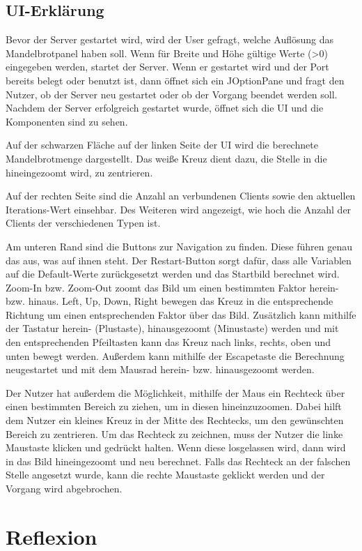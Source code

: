 \documentclass[12pt, onecolumn, notitlepage]{scrartcl}
\begin{document}
\subsection{UI-Erklärung}
Bevor der Server gestartet wird, wird der User gefragt, welche Auflösung das Mandelbrotpanel haben soll. Wenn für Breite und Höhe gültige Werte (>0) eingegeben werden, startet der Server. Wenn er gestartet wird und der Port bereits belegt oder benutzt ist, dann öffnet sich ein JOptionPane und fragt den Nutzer, ob der Server neu gestartet oder ob der Vorgang beendet werden soll. Nachdem der Server erfolgreich gestartet wurde, öffnet sich die UI und die Komponenten sind zu sehen. \par
Auf der schwarzen Fläche auf der linken Seite der UI wird die berechnete Mandelbrotmenge dargestellt. Das weiße Kreuz dient dazu, die Stelle in die hineingezoomt wird, zu zentrieren. \par
Auf der rechten Seite sind die Anzahl an verbundenen Clients sowie den aktuellen Iterations-Wert einsehbar. Des Weiteren wird angezeigt, wie hoch die Anzahl der Clients der verschiedenen Typen ist. \par
Am unteren Rand sind die Buttons zur Navigation zu finden. Diese führen genau das aus, was auf ihnen steht. Der Restart-Button sorgt dafür, dass alle Variablen auf die Default-Werte zurückgesetzt werden und das Startbild berechnet wird. Zoom-In bzw. Zoom-Out zoomt das Bild um einen bestimmten Faktor herein- bzw. hinaus. Left, Up, Down, Right bewegen das Kreuz in die entsprechende Richtung um einen entsprechenden Faktor über das Bild. Zusätzlich kann mithilfe der Tastatur herein- (Plustaste), hinausgezoomt (Minustaste) werden und mit den entsprechenden Pfeiltasten kann das Kreuz nach links, rechts, oben und unten bewegt werden. Außerdem kann mithilfe der Escapetaste die Berechnung neugestartet und mit dem Mausrad herein- bzw. hinausgezoomt werden. \par
Der Nutzer hat außerdem die Möglichkeit, mithilfe der Maus ein Rechteck über einen bestimmten Bereich zu ziehen, um in diesen hineinzuzoomen. Dabei hilft dem Nutzer ein kleines Kreuz in der Mitte des Rechtecks, um den gewünschten Bereich zu zentrieren. Um das Rechteck zu zeichnen, muss der Nutzer die linke Maustaste klicken und gedrückt halten. Wenn diese losgelassen wird, dann wird in das Bild hineingezoomt und neu berechnet. Falls das Rechteck an der falschen Stelle angesetzt wurde, kann die rechte Maustaste geklickt werden und der Vorgang wird abgebrochen.


\section{Reflexion}


\nocite{*}
\end{document}
